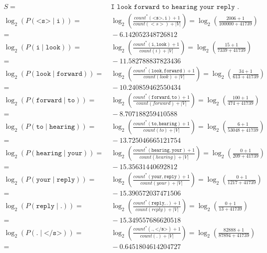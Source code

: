 \documentclass{article}
\begin{document}
\begin{equation}\begin{split}
S =&\ \texttt{I look forward to hearing your reply .} \\
\log_{2} (P(\texttt{<s>} \mid \texttt{i})) =&\  \log_{2} (\frac{count^{*}(\texttt{<s>} , \texttt{i}) + 1}{count(<s>) + |V|}) = \log_{2} (\frac{2006 + 1}{100000 + 41739})  \\ =&\ -6.142052348726812  \\
\log_{2} (P(\texttt{i} \mid \texttt{look})) =&\  \log_{2} (\frac{count^{*}(\texttt{i} , \texttt{look}) + 1}{count(i) + |V|}) = \log_{2} (\frac{15 + 1}{7339 + 41739})  \\ =&\ -11.582788837823436  \\
\log_{2} (P(\texttt{look} \mid \texttt{forward})) =&\  \log_{2} (\frac{count^{*}(\texttt{look} , \texttt{forward}) + 1}{count(look) + |V|}) = \log_{2} (\frac{34 + 1}{613 + 41739})  \\ =&\ -10.240859462550434  \\
\log_{2} (P(\texttt{forward} \mid \texttt{to})) =&\  \log_{2} (\frac{count^{*}(\texttt{forward} , \texttt{to}) + 1}{count(forward) + |V|}) = \log_{2} (\frac{100 + 1}{474 + 41739})  \\ =&\ -8.707188259410588  \\
\log_{2} (P(\texttt{to} \mid \texttt{hearing})) =&\  \log_{2} (\frac{count^{*}(\texttt{to} , \texttt{hearing}) + 1}{count(to) + |V|}) = \log_{2} (\frac{6 + 1}{53048 + 41739})  \\ =&\ -13.725046665121754  \\
\log_{2} (P(\texttt{hearing} \mid \texttt{your})) =&\  \log_{2} (\frac{count^{*}(\texttt{hearing} , \texttt{your}) + 1}{count(hearing) + |V|}) = \log_{2} (\frac{0 + 1}{209 + 41739})  \\ =&\ -15.35631440692812  \\
\log_{2} (P(\texttt{your} \mid \texttt{reply})) =&\  \log_{2} (\frac{count^{*}(\texttt{your} , \texttt{reply}) + 1}{count(your) + |V|}) = \log_{2} (\frac{0 + 1}{1217 + 41739})  \\ =&\ -15.390572037471506  \\
\log_{2} (P(\texttt{reply} \mid \texttt{.})) =&\  \log_{2} (\frac{count^{*}(\texttt{reply} , \texttt{.}) + 1}{count(reply) + |V|}) = \log_{2} (\frac{0 + 1}{13 + 41739})  \\ =&\ -15.349557686620518  \\
\log_{2} (P(\texttt{.} \mid \texttt{</s>})) =&\  \log_{2} (\frac{count^{*}(\texttt{.} , \texttt{</s>}) + 1}{count(.) + |V|}) = \log_{2} (\frac{82888 + 1}{87894 + 41739})  \\ =&\ -0.6451804614204727  \\

\end{split}
\end{equation}
\end{document}
